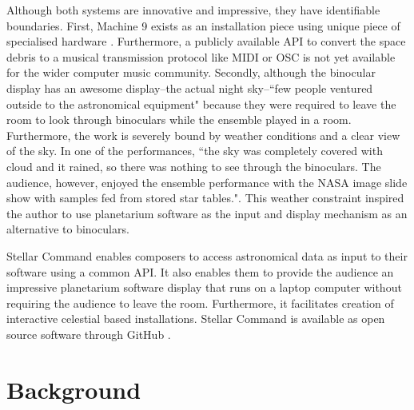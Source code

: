 \documentclass[10pt,a4paper,extrafontsizes]{memoir}
\begin{document}
Although both systems are innovative and impressive, they have identifiable boundaries. First, Machine 9 exists as an installation piece using unique piece of specialised hardware \cite{spaceDebrisYoutube}.  Furthermore, a publicly available API to convert the space debris to a musical transmission protocol like MIDI or OSC \cite{wright1997open} is not yet available for the wider computer music community. Secondly, although the binocular display has an awesome display--the actual night sky--``few people ventured outside to the astronomical equipment"\cite[p. ~50]{fraietta2014musical} because they were required to leave the room to look through binoculars while the ensemble played in a room. Furthermore, the work is severely bound by weather conditions and a clear view of the sky. In one of the performances, ``the sky was completely covered with cloud and it rained, so there was nothing to see through the binoculars. The audience, however, enjoyed the ensemble performance with the NASA image slide show with samples fed from stored star tables."\cite[p. ~50]{fraietta2014musical}.  This weather constraint inspired the author to use planetarium software as the input and display mechanism as an alternative to binoculars.  

Stellar Command enables composers to access astronomical data as input to their software using a common API.  It also enables them to provide the audience an impressive planetarium software display that runs on a laptop computer without requiring the audience to leave the room. Furthermore, it facilitates creation of interactive celestial based installations. Stellar Command is available as open source software through GitHub \cite{fraiettaSTELLARCOMMAND}.

\chapter{Background}
\end{document}
